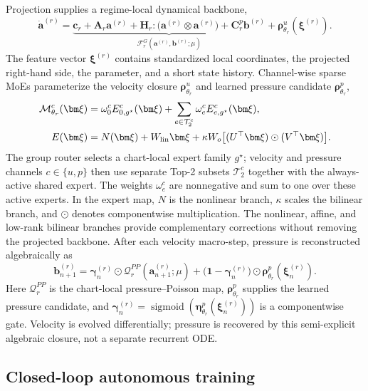 Projection supplies a regime-local dynamical backbone,
\begin{equation}
  \dot{\bm a}^{(r)}=
  \underbrace{\bm c_r+\bm A_r\bm a^{(r)}+
  \bm H_r:\bigl(\bm a^{(r)}\otimes\bm a^{(r)}\bigr)+
  \bm C^p_r\bm b^{(r)}}_{\mathcal F_r^{G}(\bm a^{(r)},\bm b^{(r)};\mu)}
  +\bm\rho^u_{\theta_r}(\bm\xi^{(r)}).
  \label{eq:main_specialist}
\end{equation}
The feature vector $\bm\xi^{(r)}$ contains standardized local coordinates, the projected right-hand side, the parameter, and a short state history. Channel-wise sparse MoEs parameterize the velocity closure $\bm\rho^u_{\theta_r}$ and learned pressure candidate $\bm\rho^p_{\theta_r}$,
\begin{equation}
  \begin{aligned}
  \mathcal M^c_{\theta_r}(\bm\xi)&=
  \omega^c_0 E^c_{0,g^\star}(\bm\xi)+
  \sum_{e\in\mathcal T_2^c}\omega^c_e E^c_{e,g^\star}(\bm\xi),\\
  E(\bm\xi)&=N(\bm\xi)+W_{\rm lin}\bm\xi+
  \kappa W_o\bigl[(U^\top\bm\xi)\odot(V^\top\bm\xi)\bigr].
  \end{aligned}
  \label{eq:main_inner_moe}
\end{equation}
The group router selects a chart-local expert family $g^\star$; velocity and pressure channels
$c\in\{u,p\}$ then use separate Top-2 subsets $\mathcal T_2^c$ together with the
always-active shared expert. The weights $\omega_e^c$ are nonnegative and sum to one
over these active experts. In the expert map, $N$ is the nonlinear branch, $\kappa$
scales the bilinear branch, and $\odot$ denotes componentwise multiplication.
The nonlinear, affine, and low-rank bilinear branches
provide complementary corrections without removing the projected backbone.
After each velocity macro-step, pressure is reconstructed algebraically as
\begin{equation}
  \bm b_{n+1}^{(r)}
  =\bm\gamma_n^{(r)}\odot\mathcal Q_r^{PP}(\bm a_{n+1}^{(r)};\mu)
  +\bigl(\bm 1-\bm\gamma_n^{(r)}\bigr)
   \odot\bm\rho^p_{\theta_r}(\bm\xi_n^{(r)}).
  \label{eq:main_pressure_closure}
\end{equation}
Here $\mathcal Q_r^{PP}$ is the chart-local pressure--Poisson map,
$\bm\rho^p_{\theta_r}$ supplies the learned pressure candidate, and
$\bm\gamma_n^{(r)}=\operatorname{sigmoid}(\bm\eta^p_{\theta_r}(\bm\xi_n^{(r)}))$
is a componentwise gate. Velocity is evolved differentially; pressure is recovered
by this semi-explicit algebraic closure, not a separate recurrent ODE.

\subsection{Closed-loop autonomous training}

